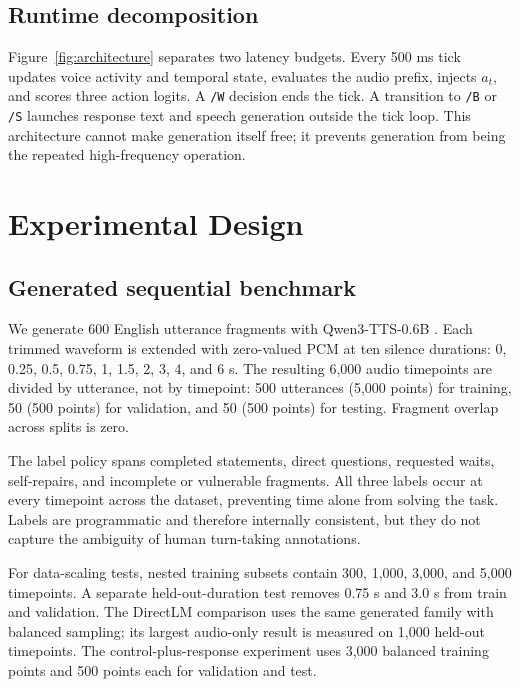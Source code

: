 \documentclass[10pt,twocolumn]{article}
\newcommand{\code}[1]{\texttt{#1}}
\begin{document}
\subsection{Runtime decomposition}

Figure~\ref{fig:architecture} separates two latency budgets. Every 500 ms tick updates voice activity and temporal state, evaluates the audio prefix, injects $a_t$, and scores three action logits. A \code{/W} decision ends the tick. A transition to \code{/B} or \code{/S} launches response text and speech generation outside the tick loop. This architecture cannot make generation itself free; it prevents generation from being the repeated high-frequency operation.

\section{Experimental Design}

\subsection{Generated sequential benchmark}

We generate 600 English utterance fragments with Qwen3-TTS-0.6B \cite{hu2026qwen3tts}. Each trimmed waveform is extended with zero-valued PCM at ten silence durations: 0, 0.25, 0.5, 0.75, 1, 1.5, 2, 3, 4, and 6 s. The resulting 6,000 audio timepoints are divided by utterance, not by timepoint: 500 utterances (5,000 points) for training, 50 (500 points) for validation, and 50 (500 points) for testing. Fragment overlap across splits is zero.

The label policy spans completed statements, direct questions, requested waits, self-repairs, and incomplete or vulnerable fragments. All three labels occur at every timepoint across the dataset, preventing time alone from solving the task. Labels are programmatic and therefore internally consistent, but they do not capture the ambiguity of human turn-taking annotations.

For data-scaling tests, nested training subsets contain 300, 1,000, 3,000, and 5,000 timepoints. A separate held-out-duration test removes 0.75 s and 3.0 s from train and validation. The DirectLM comparison uses the same generated family with balanced sampling; its largest audio-only result is measured on 1,000 held-out timepoints. The control-plus-response experiment uses 3,000 balanced training points and 500 points each for validation and test.
\end{document}
